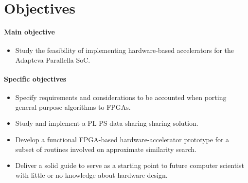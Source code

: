 \documentclass[11pt,letterpaper]{article}
\begin{document}
\section{Objectives}

\paragraph{Main objective}
\begin{itemize}
\item Study the feasibility of implementing hardware-based accelerators for the Adapteva Parallella SoC.
\end{itemize}

\paragraph{Specific objectives}
\begin{itemize}
    \item Specify requirements and considerations to be accounted when porting general purpose algorithms to FPGAs.
    \item Study and implement a PL-PS data sharing sharing solution.
    \item Develop a functional FPGA-based hardware-accelerator prototype for a subset of routines involved on approximate similarity search.
    \item Deliver a solid guide to serve as a starting point to future computer scientist with little or no knowledge about hardware design. 
\end{itemize}
\end{document}
